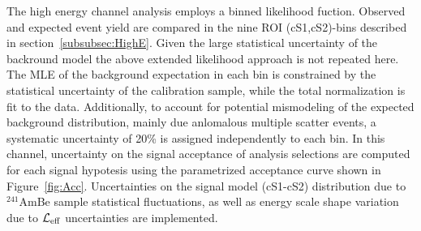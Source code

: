 The high energy channel analysis employs a binned likelihood fuction. Observed and expected event yield are compared in the nine ROI (cS1,cS2)-bins described in section~\ref{subsubsec:HighE}. 
Given the large statistical uncertainty of the backround model the above extended likelihood approach is not repeated here.
The MLE of the background expectation in each bin is constrained by the statistical uncertainty of the calibration sample, while the total 
normalization is fit to the data. Additionally, to account for potential mismodeling of the expected background distribution, mainly due anlomalous multiple scatter events,
a systematic uncertainty of 20\% is assigned independently to each bin. In this channel, uncertainty on the signal acceptance of analysis selections are computed for each signal hypotesis
using the parametrized acceptance curve shown in Figure~\ref{fig:Acc}.
Uncertainties on the signal model (cS1-cS2) distribution due to $^{241}$AmBe sample statistical fluctuations, as well as energy scale shape variation due to $\mathcal{L}_{\mathrm{eff}}$ uncertainties are implemented.





